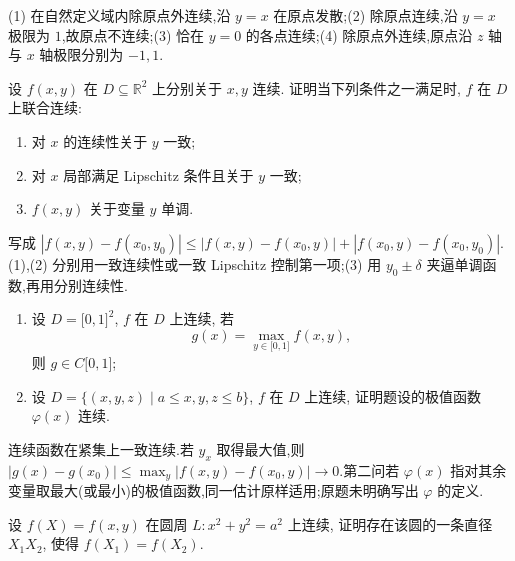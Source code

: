 \begin{solution}

    (1) 在自然定义域内除原点外连续,沿 $y=x$ 在原点发散;(2) 除原点连续,沿 $y=x$ 极限为 $1$,故原点不连续;(3) 恰在 $y=0$ 的各点连续;(4) 除原点外连续,原点沿 $z$ 轴与 $x$ 轴极限分别为 $-1,1$.
\end{solution}

\begin{example}[\markstar]
    设 $f(x,y)$ 在 $D\subseteq\mathbb{R}^2$ 上分别关于 $x,y$ 连续. 证明当下列条件之一满足时, $f$ 在 $D$ 上联合连续:
    \begin{enumerate}
        \item 对 $x$ 的连续性关于 $y$ 一致;
        \item 对 $x$ 局部满足 Lipschitz 条件且关于 $y$ 一致;
        \item $f(x,y)$ 关于变量 $y$ 单调.
    \end{enumerate}
\end{example}
\exampleblank

\begin{solution}
    写成 $|f(x,y)-f(x_0,y_0)|\leq|f(x,y)-f(x_0,y)|+|f(x_0,y)-f(x_0,y_0)|$.(1),(2) 分别用一致连续性或一致 Lipschitz 控制第一项;(3) 用 $y_0\pm\delta$ 夹逼单调函数,再用分别连续性.
\end{solution}

\begin{example}[\markstar]
    \begin{enumerate}
        \item 设 $D=\lbrack0,1\rbrack^2$, $f$ 在 $D$ 上连续, 若
              \[
                  g(x)=\max_{y\in\lbrack0,1\rbrack}f(x,y),
              \]
              则 $g\in C\lbrack0,1\rbrack$;
        \item 设 $D=\{(x,y,z)\mid a\leq x,y,z\leq b\}$, $f$ 在 $D$ 上连续, 证明题设的极值函数 $\varphi(x)$ 连续.
    \end{enumerate}
\end{example}
\exampleblank

\begin{solution}
    连续函数在紧集上一致连续.若 $y_x$ 取得最大值,则
    $|g(x)-g(x_0)|\leq\max_y|f(x,y)-f(x_0,y)|\to0$.第二问若 $\varphi(x)$ 指对其余变量取最大(或最小)的极值函数,同一估计原样适用;原题未明确写出 $\varphi$ 的定义.
\end{solution}

\begin{example}
    设 $f(X)=f(x,y)$ 在圆周 $L:x^2+y^2=a^2$ 上连续, 证明存在该圆的一条直径 $X_1X_2$, 使得 $f(X_1)=f(X_2)$.
\end{example}
\exampleblank

